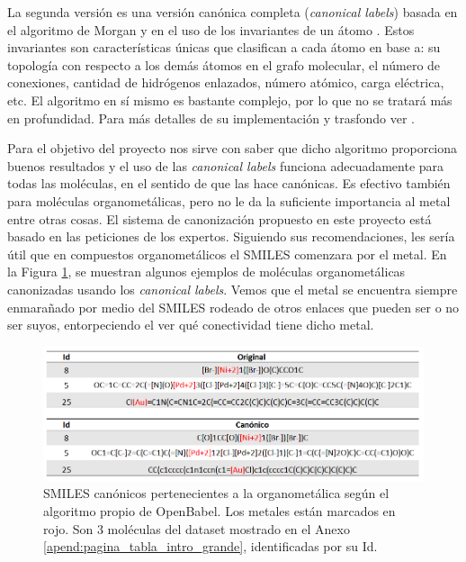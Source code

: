 La segunda versión es una versión canónica completa (\textit{canonical labels}) basada en el algoritmo de Morgan y en el uso de los invariantes de un átomo \cite{vogt_powerpoint, apodaca_computing_2019}. Estos invariantes son características únicas que clasifican a cada átomo en base a: su topología con respecto a los demás átomos en el grafo molecular, el número de conexiones, cantidad de hidrógenos enlazados, número atómico, carga eléctrica, etc. El algoritmo en sí mismo es bastante complejo, por lo que no se tratará más en profundidad. Para más detalles de su implementación y trasfondo ver \cite{weininger_smiles_1989, canonical_coding_algorithm, jochum_canonical_1977, vogt_powerpoint}. 

Para el objetivo del proyecto nos sirve con saber que dicho algoritmo proporciona buenos resultados y el uso de las \textit{canonical labels} funciona adecuadamente para todas las moléculas, en el sentido de que las hace canónicas. Es efectivo también para moléculas organometálicas, pero no le da la suficiente importancia al metal entre otras cosas. El sistema de canonización propuesto en este proyecto está basado en las peticiones de los expertos. Siguiendo sus recomendaciones, les sería útil que en compuestos organometálicos el SMILES comenzara por el metal. En la Figura \ref{fig:canonicos_mal_implementacion}, se muestran algunos ejemplos de moléculas organometálicas canonizadas usando los \textit{canonical labels}. Vemos que el metal se encuentra siempre enmarañado por medio del SMILES rodeado de otros enlaces que pueden ser o no ser suyos, entorpeciendo el ver qué conectividad tiene dicho metal. 

\begin{figure}[h!]
    \centering
    \includegraphics[scale=0.5]{imagenes/diseno/canonizado/canonicos_mal_implementacion.png}
    \caption{SMILES canónicos pertenecientes a la organometálica según el algoritmo propio de OpenBabel. Los metales están marcados en rojo. Son 3 moléculas del dataset mostrado en el Anexo \ref{apend:pagina_tabla_intro_grande}, identificadas por su Id.} 
    \label{fig:canonicos_mal_implementacion}
\end{figure}



